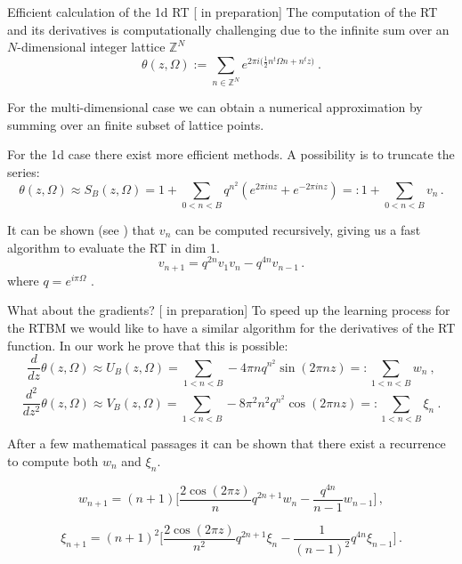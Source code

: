 \documentclass[10pt]{beamer}
\begin{document}
\begin{frame}{Efficient calculation of the 1d RT \hfill \small [\cite{new} in preparation]}
    The computation of the RT and its derivatives is computationally challenging due to the infinite sum over 
    an $N$-dimensional integer lattice $\mathbb{Z}^N$
    \begin{equation*}
        \theta ( z, \Omega) :=
        \sum_{n \in \mathbb{Z}^N} e^{2 \pi i \big( \frac{1}{2}n^t \Omega n + n^t z \big)} \ .
    \end{equation*}

    For the multi-dimensional case we can obtain a numerical approximation by summing over an finite subset of lattice points.

    For the 1d case there exist more efficient methods.
    A possibility is to truncate the series:
    \begin{equation*}
        \theta ( z, \Omega) \approx S_B(z, \Omega) = 1 + \sum_{0 < n < B}  q^{n^2} (e^{2 \pi i n z} + e^{- 2 \pi i n z}) =: 
        1 + \sum_{0 < n < B} v_n \, .
    \end{equation*}


    It can be shown (see \cite{theta}) that $v_n$ can be computed recursively, giving us a fast algorithm to evaluate
    the RT in dim 1.
    \begin{equation}
            v_{n+1} = q^{ 2 n} v_1 v_n - q^{4 n} v_{n-1} \,. 
        \end{equation}
        where  $q = e^{i \pi \Omega}$ .
\end{frame}

\begin{frame}{What about the gradients? \hfill \small [\cite{new} in preparation]}
    To speed up the learning process for the RTBM we would like to have a similar algorithm for the derivatives
    of the RT function. 
    In our work he prove that this is possible:
    \begin{equation*}
        \frac{d}{d z} \theta(z, \Omega) \approx U_B(z, \Omega) = \sum_{1 < n < B}  - 4 \pi n  q^{n^2} \sin(2 \pi n z) =:  \sum_{1 < n < B} w_n \ ,
   \end{equation*}
   \begin{equation*}
    \frac{d^2}{d z^2} \theta(z, \Omega) \approx V_B(z, \Omega) = \sum_{1 < n < B}  - 8 \pi^2 n^2 q^{n^2} \cos(2 \pi n z) =:  \sum_{1 < n < B} \xi_n \ .
   \end{equation*}

   After a few mathematical passages it can be shown that there exist a recurrence to compute both $w_n$ and $\xi_n$.


   \begin{equation*}
    w_{n+1} =  (n+1) \bigg[ \frac{2 \cos(2 \pi z)}{n} q^{2n + 1} w_n - 
    \frac{q^{4n}}{n-1} w_{n-1}\bigg]\,,
   \end{equation*}

   \begin{equation*}
        \xi_{n+1} = (n+1)^2 \bigg[ \frac{2 \cos( 2 \pi z)}{n^2} q^{2 n + 1} \xi_n 
        - \frac{1}{(n-1)^2}  q^{4n}\xi_{n-1} \bigg]\,.
   \end{equation*}

\end{frame}
\end{document}
